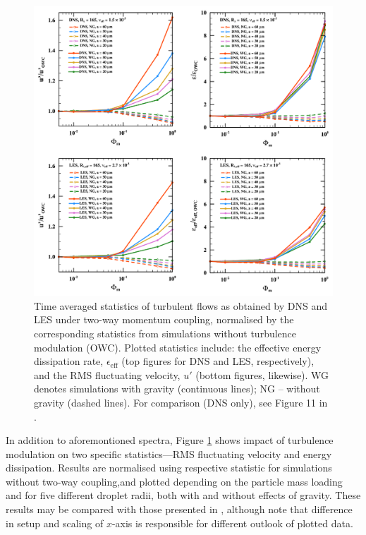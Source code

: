 \documentclass{pracamgren}
\begin{document}
\begin{figure}[h]
\centering
\includegraphics[width=13.5cm]{figures/2-05_modstat.pdf}
\caption{
Time averaged statistics of turbulent flows as obtained by DNS and LES under two-way momentum coupling, normalised by the corresponding statistics from simulations without turbulence modulation (OWC).
Plotted statistics include: the effective energy dissipation rate, $\epsilon_{\text{eff}}$ (top figures for DNS and LES, respectively), and the RMS fluctuating velocity, $u'$ (bottom figures, likewise).
WG denotes simulations with gravity (continuous lines); NG -- without gravity (dashed lines).
For comparison (DNS only), see Figure 11 in \textcite{Rosa2020}.
}
\label{fig:modstat}
\end{figure}

In addition to aforemontioned spectra, Figure \ref{fig:modstat} shows impact of turbulence modulation on two specific statistics---RMS fluctuating velocity and energy dissipation.
Results are normalised using respective statistic for simulations without two-way coupling,and plotted depending on the particle mass loading and for five different droplet radii, both with and without effects of gravity.
These results may be compared with those presented in \textcite[Figure 11 therein]{Rosa2020}, although note that difference in setup and scaling of $x$-axis is responsible for different outlook of plotted data.
\end{document}

